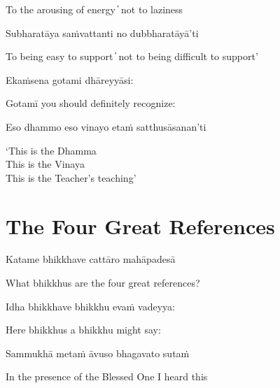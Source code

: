 \begin{cprenglish}
  To the arousing of energy  ̓  not to laziness
\end{cprenglish}

Subharatāya saṁvattanti no dubbharatāyā’ti

\begin{cprenglish}
  To being easy to support  ̓  not to being difficult to support’
\end{cprenglish}

Ekaṁsena gotami dhāreyyāsi:

\begin{cprenglish}
  Gotamī you should definitely recognize:
\end{cprenglish}

Eso dhammo eso vinayo etaṁ satthusāsanan’ti

\begin{cprenglish}
  ‘This is the Dhamma\\
  This is the Vinaya\\
  This is the Teacher’s teaching’
\end{cprenglish}


\clearpage

\section{The Four Great References}

\begin{leader}
\end{leader}

Katame bhikkhave cattāro mahāpadesā

\begin{cprenglish}
  What bhikkhus are the four great references?
\end{cprenglish}

Idha bhikkhave bhikkhu evaṁ vadeyya:

\begin{cprenglish}
  Here bhikkhus a bhikkhu might say:
\end{cprenglish}

Sammukhā metaṁ āvuso bhagavato sutaṁ

\begin{cprenglish}
  In the presence of the Blessed One I heard this
\end{cprenglish}

